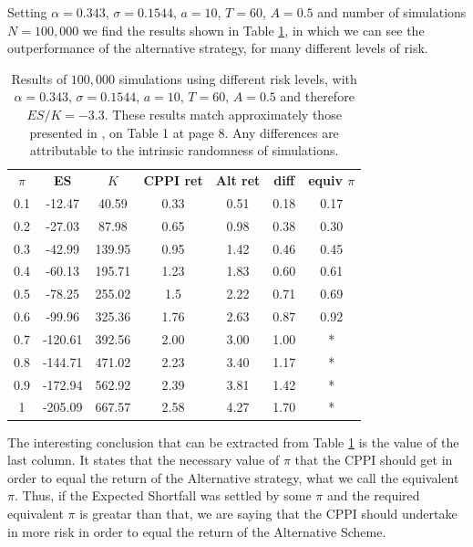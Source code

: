 Setting $\alpha = 0.343$, $\sigma = 0.1544$, $a = 10$, $T = 60$, $A = 0.5$ and number of simulations $N = 100,000$ we find the results shown in Table \ref{tab:cppi_alt}, in which we can see the outperformance of the alternative strategy, for many different levels of risk.

\begin{table}[H]
\centering
\caption{Results of $100,000$ simulations using different risk levels, with $\alpha = 0.343$, $\sigma = 0.1544$, $a = 10$, $T = 60$, $A = 0.5$ and therefore $ES/K = -3.3$. These results match approximately those presented in \cite{a:guillen-optimisation}, on Table 1 at page 8. Any differences are attributable to the intrinsic randomness of simulations.}
\label{tab:cppi_alt}
\begin{tabular}{ccccccc}
\textbf{$\pi$} & \textbf{ES } & \textbf{$K$} & \textbf{CPPI ret} & \textbf{Alt ret} & \textbf{diff}  & \textbf{equiv $\pi$}\\
0.1   & -12.47  & 40.59  & 0.33     & 0.51    & 0.18    & 0.17\\
0.2   & -27.03  & 87.98  & 0.65     & 0.98    & 0.38    & 0.30 \\
0.3   & -42.99  & 139.95 & 0.95     & 1.42    & 0.46    & 0.45 \\
0.4   & -60.13  & 195.71 & 1.23     & 1.83    & 0.60    & 0.61 \\
0.5   & -78.25  & 255.02 & 1.5      & 2.22    & 0.71    & 0.69 \\
0.6   & -99.96  & 325.36 & 1.76     & 2.63    & 0.87    & 0.92 \\
0.7   & -120.61 & 392.56 & 2.00     & 3.00    & 1.00    & * \\
0.8   & -144.71 & 471.02 & 2.23     & 3.40    & 1.17    & * \\
0.9   & -172.94 & 562.92 & 2.39     & 3.81    & 1.42    & * \\
1     & -205.09 & 667.57 & 2.58     & 4.27    & 1.70    & *
\end{tabular}
\end{table}

The interesting conclusion that can be extracted from Table \ref{tab:cppi_alt} is the value of the last column. It states that the necessary value of $\pi$ that the CPPI should get in order to equal the return of the Alternative strategy, what we call the equivalent $\pi$. Thus, if the Expected Shortfall was settled by some $\pi$ and the required equivalent $\pi$ is greatar than that, we are saying that the CPPI should undertake in more risk in order to equal the return of the Alternative Scheme.

